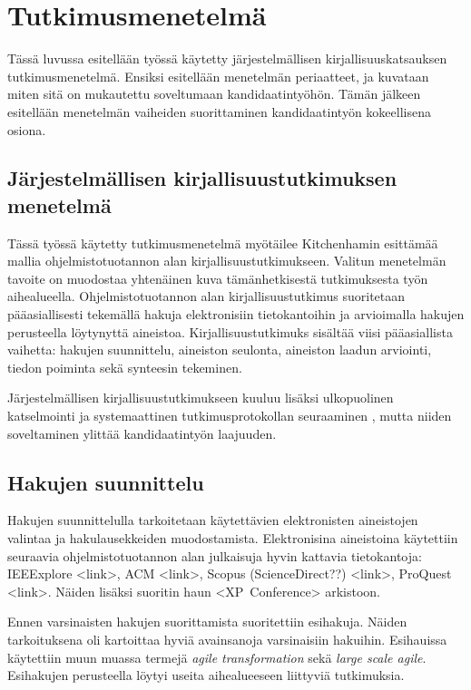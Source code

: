 
\section{Tutkimusmenetelmä}
\label{sec:menetelma}

Tässä luvussa esitellään työssä käytetty järjestelmällisen
kirjallisuuskatsauksen tutkimusmenetelmä. Ensiksi esitellään menetelmän
periaatteet, ja kuvataan miten sitä on mukautettu soveltumaan kandidaatintyöhön.
Tämän jälkeen esitellään menetelmän vaiheiden suorittaminen kandidaatintyön
kokeellisena osiona.

\subsection{Järjestelmällisen kirjallisuustutkimuksen menetelmä}

Tässä työssä käytetty tutkimusmenetelmä myötäilee Kitchenhamin esittämää mallia
ohjelmistotuotannon alan kirjallisuustutkimukseen. Valitun menetelmän tavoite on
muodostaa yhtenäinen kuva tämänhetkisestä tutkimuksesta työn aihealueella.
Ohjelmistotuotannon alan kirjallisuustutkimus suoritetaan pääasiallisesti
tekemällä hakuja elektronisiin tietokantoihin ja arvioimalla hakujen perusteella
löytynyttä aineistoa. Kirjallisuustutkimuks sisältää viisi pääasiallista
vaihetta: hakujen suunnittelu, aineiston seulonta, aineiston laadun arviointi,
tiedon poiminta sekä synteesin tekeminen. \citep{Kitchenham2007}

Järjestelmällisen kirjallisuustutkimukseen kuuluu lisäksi ulkopuolinen
katselmointi ja systemaattinen tutkimusprotokollan seuraaminen
\citep{Kitchenham2007}, mutta niiden soveltaminen ylittää kandidaatintyön
laajuuden.

\subsection{Hakujen suunnittelu}
Hakujen suunnittelulla tarkoitetaan käytettävien elektronisten aineistojen
valintaa ja hakulausekkeiden muodostamista. Elektronisina aineistoina käytettiin
seuraavia ohjelmistotuotannon alan julkaisuja hyvin kattavia tietokantoja:
IEEExplore <link>, ACM <link>, Scopus (ScienceDirect??) <link>, ProQuest <link>.
Näiden lisäksi suoritin haun <XP~Conference> arkistoon.

Ennen varsinaisten hakujen suorittamista suoritettiin esihakuja. Näiden
tarkoituksena oli kartoittaa hyviä avainsanoja varsinaisiin hakuihin. Esihauissa
käytettiin muun muassa termejä \textit{agile transformation} sekä \textit{large
scale agile}. Esihakujen perusteella löytyi useita aihealueeseen liittyviä
tutkimuksia.

